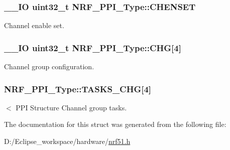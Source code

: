 \subsubsection[{C\+H\+E\+N\+S\+E\+T}]{\setlength{\rightskip}{0pt plus 5cm}\+\_\+\+\_\+\+I\+O uint32\+\_\+t N\+R\+F\+\_\+\+P\+P\+I\+\_\+\+Type\+::\+C\+H\+E\+N\+S\+E\+T}\label{struct_n_r_f___p_p_i___type_a6b36decd8a32c616b73b51681e6e302c}
Channel enable set. \hypertarget{struct_n_r_f___p_p_i___type_a2f326718b35b630ed41246c642f4de41}{}
\subsubsection[{C\+H\+G}]{\setlength{\rightskip}{0pt plus 5cm}\+\_\+\+\_\+\+I\+O uint32\+\_\+t N\+R\+F\+\_\+\+P\+P\+I\+\_\+\+Type\+::\+C\+H\+G\mbox{[}4\mbox{]}}\label{struct_n_r_f___p_p_i___type_a2f326718b35b630ed41246c642f4de41}
Channel group configuration. \hypertarget{struct_n_r_f___p_p_i___type_a16a82ced7f5dfaf384b24f08e41b8407}{}
\subsubsection[{T\+A\+S\+K\+S\+\_\+\+C\+H\+G}]{ N\+R\+F\+\_\+\+P\+P\+I\+\_\+\+Type\+::\+T\+A\+S\+K\+S\+\_\+\+C\+H\+G\mbox{[}4\mbox{]}}\label{struct_n_r_f___p_p_i___type_a16a82ced7f5dfaf384b24f08e41b8407}
$<$ P\+P\+I Structure Channel group tasks. 

The documentation for this struct was generated from the following file\+:\begin{DoxyCompactItemize}
\item 
D\+:/\+Eclipse\+\_\+workspace/hardware/\hyperlink{nrf51_8h}{nrf51.\+h}\end{DoxyCompactItemize}
